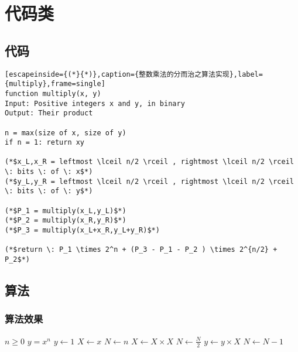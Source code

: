 \documentclass[math,code,logic,quote,code,mode=simple]{codedumpnote}
\begin{document}
\part{代码类}
\chapter{代码}
\begin{lstlisting}[escapeinside={(*}{*)},caption={整数乘法的分而治之算法实现},label={multiply},frame=single]
function multiply(x, y)
Input: Positive integers x and y, in binary
Output: Their product

n = max(size of x, size of y) 
if n = 1: return xy

(*$x_L,x_R = leftmost \lceil n/2 \rceil , rightmost \lceil n/2 \rceil \: bits \: of \: x$*)
(*$y_L,y_R = leftmost \lceil n/2 \rceil , rightmost \lceil n/2 \rceil \: bits \: of \: y$*)

(*$P_1 = multiply(x_L,y_L)$*)
(*$P_2 = multiply(x_R,y_R)$*)
(*$P_3 = multiply(x_L+x_R,y_L+y_R)$*)

(*$return \: P_1 \times 2^n + (P_3 - P_1 - P_2 ) \times 2^{n/2} + P_2$*)
\end{lstlisting}

\chapter{算法}

\section{算法效果}

\begin{algorithm}
\caption{An algorithm with caption}\label{alg:cap}
\begin{algorithmic}
\Require $n \geq 0$
\Ensure $y = x^n$
\State $y \gets 1$
\State $X \gets x$
\State $N \gets n$
    \State $X \gets X \times X$
    \State $N \gets \frac{N}{2}$  
    \State $y \gets y \times X$
    \State $N \gets N - 1$
\EndIf
\EndWhile
\end{algorithmic}
\end{algorithm}
\end{document}
